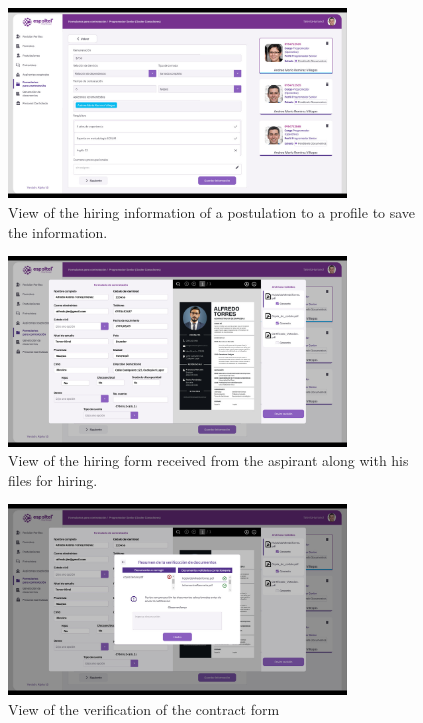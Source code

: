 \documentclass{scrreprt}
\begin{document}
\begin{figure}[H]
	\centering \small
	\includegraphics[width=0.8\textwidth]{WebPrototype/wflow-35.jpeg}
	\caption{View of the hiring information of a postulation to a profile to save the information.}
\end{figure}

\begin{figure}[H]
	\centering \small
	\includegraphics[width=0.8\textwidth]{WebPrototype/wflow-36.jpeg}
	\caption{View of the hiring form received from the aspirant along with his files for hiring.}
\end{figure}

\begin{figure}[H]
	\centering \small
	\includegraphics[width=0.8\textwidth]{WebPrototype/wflow-37.jpeg}
	\caption{View of the verification of the contract form}
\end{figure}
\end{document}
